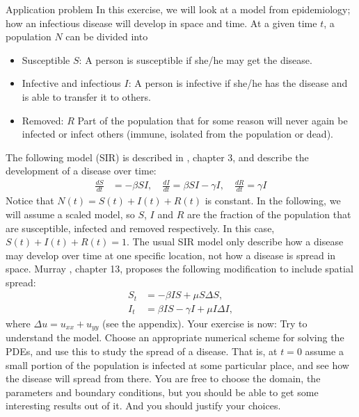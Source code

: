\clearpage

\begin{railingbox}{Application problem}
  In this exercise, we will look at a model from epidemiology; how an infectious disease will develop in space and time.
  At a given time \(t\), a population \(N\) can be divided into
  \begin{itemize}
    \item Susceptible \(S\): A person is susceptible if she/he may get the disease.
    \item Infective and infectious \(I\): A person is infective if she/he has the disease and is able to transfer it to others.
    \item Removed: \(R\) Part of the population that for some reason will never again be infected or infect others (immune, isolated from the population or dead).
  \end{itemize}
  The following model (SIR) is described in \cite{murray2002mathematical}, chapter 3, and describe the development of a disease over time:
  \begin{align}
    \frac{dS}{dt} & = -\beta SI, \quad \frac{dI}{dt} = \beta SI - \gamma I, \quad \frac{dR}{dt} = \gamma I  \label{eq:sir_model}
  \end{align}
  Notice that \(N(t) = S(t) + I(t) + R(t)\) is constant.
  In the following, we will assume a scaled model, so \(S\), \(I\) and \(R\) are the fraction of the population that are susceptible, infected and removed respectively. In this case, \(S(t) + I(t) + R(t) = 1\).
  The usual SIR model only describe how a disease may develop over time at one specific location, not how a disease is spread in space. Murray \cite{murray2002mathematical}, chapter 13, proposes the following modification to include spatial spread:
  \begin{align}
    S_t & = -\beta IS + \mu S \Delta S, \nonumber                            \\
    I_t & = \beta IS - \gamma I + \mu I \Delta I, \label{eq:sir_model_space}
  \end{align}
  where \(\Delta u = u_{xx} + u_{yy}\) (see the appendix). Your exercise is now: Try to understand the
  model. Choose an appropriate numerical scheme for solving the PDEs, and use this to study the spread of a disease. That is, at \(t = 0\) assume a small portion of the population is infected at some particular place, and see how the disease
  will spread from there. You are free to choose the domain, the parameters and boundary conditions, but you should be able to get some interesting results out of it. And you should justify your choices.

\end{railingbox}
